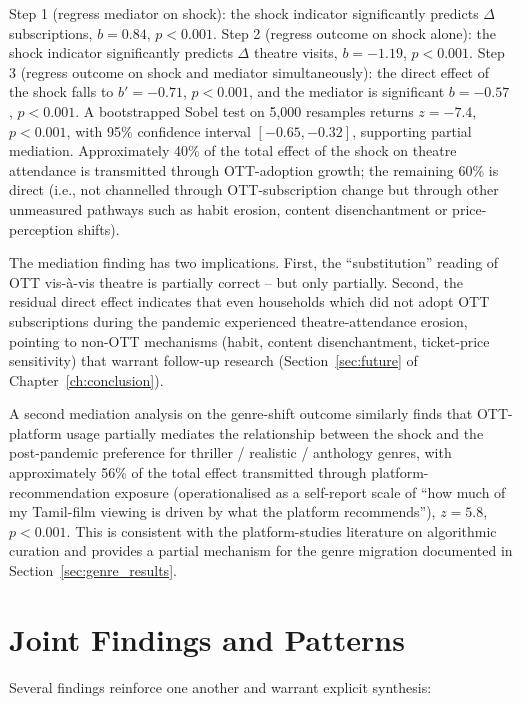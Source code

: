 Step 1 (regress mediator on shock): the shock indicator significantly
predicts $\Delta$ subscriptions, $b = 0.84$, $p < 0.001$.
Step 2 (regress outcome on shock alone): the shock indicator
significantly predicts $\Delta$ theatre visits, $b = -1.19$,
$p < 0.001$.  Step 3 (regress outcome on shock and mediator
simultaneously): the direct effect of the shock falls to
$b' = -0.71$, $p < 0.001$, and the mediator is significant
$b = -0.57$, $p < 0.001$.  A bootstrapped Sobel test
\citep{johnson2007} on 5{,}000 resamples returns
$z = -7.4$, $p < 0.001$, with 95\% confidence interval
$[-0.65, -0.32]$, supporting partial mediation.  Approximately
40\% of the total effect of the shock on theatre attendance is
transmitted through OTT-adoption growth; the remaining 60\% is
direct (i.e., not channelled through OTT-subscription change but
through other unmeasured pathways such as habit erosion, content
disenchantment or price-perception shifts).

The mediation finding has two implications.  First, the
``substitution'' reading of OTT vis-\`a-vis theatre is partially
correct -- but only partially.  Second, the residual direct effect
indicates that even households which did not adopt OTT subscriptions
during the pandemic experienced theatre-attendance erosion, pointing
to non-OTT mechanisms (habit, content disenchantment, ticket-price
sensitivity) that warrant follow-up research
(Section~\ref{sec:future} of Chapter~\ref{ch:conclusion}).

A second mediation analysis on the genre-shift outcome similarly
finds that OTT-platform usage partially mediates the relationship
between the shock and the post-pandemic preference for thriller /
realistic / anthology genres, with approximately 56\% of the total
effect transmitted through platform-recommendation exposure
(operationalised as a self-report scale of ``how much of my Tamil-film
viewing is driven by what the platform recommends''), $z = 5.8$,
$p < 0.001$.  This is consistent with the platform-studies
literature on algorithmic curation \citep{nieborg2018,
gillespie2018,vandijck2018,plantin2018} and provides a partial
mechanism for the genre migration documented in
Section~\ref{sec:genre_results}.

\section{Joint Findings and Patterns}
\label{sec:joint_findings_5}

Several findings reinforce one another and warrant explicit synthesis:

